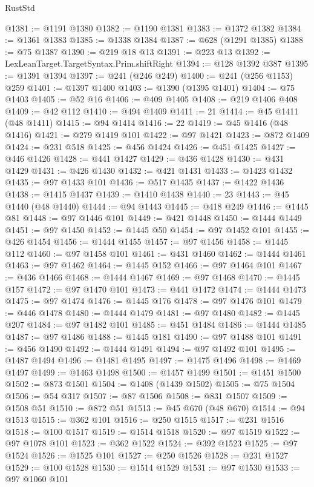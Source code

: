 \begin{lexlean}{RustStd}
\begin{coremodule}
@1381 := @1191 @1380
@1382 := @1190 @1381
@1383 := @1372 @1382
@1384 := @1361 @1383
@1385 := @1338 @1384
@1387 := @628 (@1291 @1385)
@1388 := @75 @1387
@1390 := @219 @18 @13
@1391 := @223 @13
@1392 := LexLeanTarget.TargetSyntax.Prim.shiftRight
@1394 := @128 @1392 @387
@1395 := @1391 @1394
@1397 := @241 (@246 @249)
@1400 := @241 (@256 @1153) @259
@1401 := @1397 @1400
@1403 := @1390 (@1395 @1401)
@1404 := @75 @1403
@1405 := @52 @16
@1406 := @409 @1405
@1408 := @219 @1406 @408
@1409 := @42 @112
@1410 := @494 @1409
@1411 := 21
@1414 := @45 @1411 (@48 @1411)
@1415 := @94 @1414
@1416 := 22
@1419 := @45 @1416 (@48 @1416)
@1421 := @279 @1419 @101
@1422 := @97 @1421
@1423 := @872 @1409
@1424 := @231 @518
@1425 := @456 @1424
@1426 := @451 @1425
@1427 := @446 @1426
@1428 := @441 @1427
@1429 := @436 @1428
@1430 := @431 @1429
@1431 := @426 @1430
@1432 := @421 @1431
@1433 := @1423 @1432
@1435 := @97 @1433 @101
@1436 := @517 @1435
@1437 := @1422 @1436
@1438 := @1415 @1437
@1439 := @1410 @1438
@1440 := 23
@1443 := @45 @1440 (@48 @1440)
@1444 := @94 @1443
@1445 := @418 @249
@1446 := @1445 @81
@1448 := @97 @1446 @101
@1449 := @421 @1448
@1450 := @1444 @1449
@1451 := @97 @1450
@1452 := @1445 @50
@1454 := @97 @1452 @101
@1455 := @426 @1454
@1456 := @1444 @1455
@1457 := @97 @1456
@1458 := @1445 @112
@1460 := @97 @1458 @101
@1461 := @431 @1460
@1462 := @1444 @1461
@1463 := @97 @1462
@1464 := @1445 @152
@1466 := @97 @1464 @101
@1467 := @436 @1466
@1468 := @1444 @1467
@1469 := @97 @1468
@1470 := @1445 @157
@1472 := @97 @1470 @101
@1473 := @441 @1472
@1474 := @1444 @1473
@1475 := @97 @1474
@1476 := @1445 @176
@1478 := @97 @1476 @101
@1479 := @446 @1478
@1480 := @1444 @1479
@1481 := @97 @1480
@1482 := @1445 @207
@1484 := @97 @1482 @101
@1485 := @451 @1484
@1486 := @1444 @1485
@1487 := @97 @1486
@1488 := @1445 @181
@1490 := @97 @1488 @101
@1491 := @456 @1490
@1492 := @1444 @1491
@1494 := @97 @1492 @101
@1495 := @1487 @1494
@1496 := @1481 @1495
@1497 := @1475 @1496
@1498 := @1469 @1497
@1499 := @1463 @1498
@1500 := @1457 @1499
@1501 := @1451 @1500
@1502 := @873 @1501
@1504 := @1408 (@1439 @1502)
@1505 := @75 @1504
@1506 := @54 @317
@1507 := @87 @1506
@1508 := @831 @1507
@1509 := @1508 @51
@1510 := @872 @51
@1513 := @45 @670 (@48 @670)
@1514 := @94 @1513
@1515 := @362 @101
@1516 := @250 @1515
@1517 := @231 @1516
@1518 := @100 @1517
@1519 := @1514 @1518
@1520 := @97 @1519
@1522 := @97 @1078 @101
@1523 := @362 @1522
@1524 := @392 @1523
@1525 := @97 @1524
@1526 := @1525 @101
@1527 := @250 @1526
@1528 := @231 @1527
@1529 := @100 @1528
@1530 := @1514 @1529
@1531 := @97 @1530
@1533 := @97 @1060 @101

\end{coremodule}
\end{lexlean}
